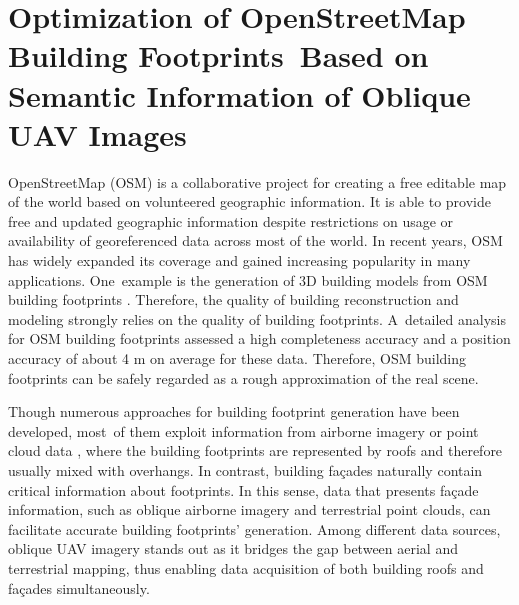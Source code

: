 \newcommand{\icol}[1]{%
  \left(\begin{smallmatrix}#1\end{smallmatrix}\right)%
}

\newcommand{\irow}[1]{%
  \begin{smallmatrix}(#1)\end{smallmatrix}%
}
\chapter{Optimization of OpenStreetMap Building Footprints~Based on Semantic Information of Oblique UAV Images}
\label{ch:lucas_arch}

OpenStreetMap (OSM) is a collaborative project for creating a free editable map of the world based on volunteered geographic information. It is able to provide free and updated geographic information despite restrictions on usage or availability of georeferenced data across most of the world. In recent years, OSM has widely expanded its coverage and gained increasing popularity in many applications. One~example is the generation of 3D building models from OSM building footprints \cite{Goetz2012towards}. Therefore, the quality of building reconstruction and modeling strongly relies on the quality of building footprints. A~detailed analysis for OSM building footprints \cite{fan2014quality} assessed a high completeness accuracy and a position accuracy of about 4 m on average for these data. Therefore, OSM building footprints can be safely regarded as a rough approximation of the real scene.

Though numerous approaches for building footprint generation have been developed, most~of them exploit information from airborne imagery \cite{mueller2005robust} or point cloud data \cite{zhou20102}, where the building footprints are represented by roofs and therefore usually mixed with overhangs. In contrast, building fa\c{c}ades naturally contain critical information about footprints. In this sense, data that presents fa\c{c}ade information, such as oblique airborne imagery and terrestrial point clouds, can facilitate accurate building footprints' generation. Among different data sources, oblique UAV 
imagery stands out as it bridges the gap between aerial and terrestrial mapping, thus enabling data acquisition of both building roofs and fa\c{c}ades simultaneously. 


